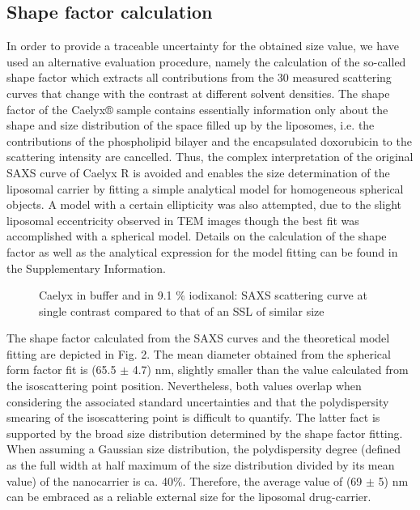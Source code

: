 \subsection{Shape factor calculation}
In order to provide a traceable uncertainty for the obtained size value, we have used an alternative evaluation procedure, namely the calculation of the so-called shape factor which extracts all contributions from the 30 measured scattering curves that change with the contrast at different solvent densities. The shape factor of the Caelyx® sample contains essentially information only about the shape and size distribution of the space filled up by the liposomes, i.e. the contributions of the phospholipid bilayer and the encapsulated doxorubicin to the scattering intensity are cancelled.  Thus, the complex interpretation of the original SAXS curve of Caelyx R is avoided and enables the size determination of the liposomal carrier by fitting a simple analytical model for homogeneous spherical objects. A model with a certain ellipticity was also attempted, due to the slight liposomal eccentricity observed in TEM images though the best fit was accomplished with a spherical model. Details on the calculation of the shape factor as well as the analytical expression for the model fitting can be found in the Supplementary Information. 

\begin{figure}
	\centering
		
		\caption{Caelyx in buffer and in 9.1 $\%$ iodixanol: SAXS scattering curve at single contrast compared to that of an SSL of similar size}
		\label{fig:CaelyxIodixanolResonantTerm}
\end{figure}

The shape factor calculated from the SAXS curves and the theoretical model fitting are depicted in Fig. 2. The mean diameter obtained from the spherical form factor fit is (65.5 $\pm$ 4.7) nm, slightly smaller than the value calculated from the isoscattering point position. Nevertheless, both values overlap when considering the associated standard uncertainties and that the polydispersity smearing of the isoscattering point is difficult to quantify. The latter fact is supported by the broad size distribution determined by the shape factor fitting. When assuming a Gaussian size distribution, the polydispersity degree (defined as the full width at half maximum of the size distribution divided by its mean value) of the nanocarrier is ca. 40$\%$. Therefore, the average value of (69 $\pm$ 5) nm can be embraced as a reliable external size for the liposomal drug-carrier.

